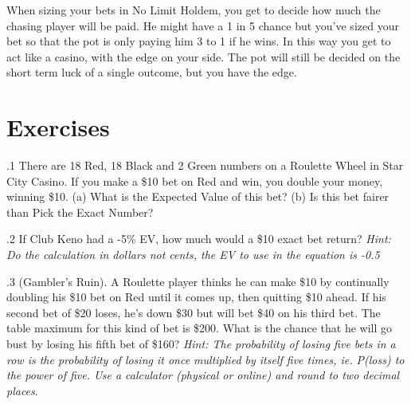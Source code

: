When sizing your bets in No Limit Holdem, you get to decide how much
the chasing player will be paid. He might have a 1 in 5 chance
but you've sized your bet so that the pot is only paying him 3 to 1
if he wins. In this way you get to act like a casino, with the edge
on your side. The pot will still be decided on the short term luck
of a single outcome, but you have the edge.

\section{Exercises}


.1 There are 18 Red, 18 Black and 2 Green numbers on
a Roulette Wheel in Star City Casino. If you make a \$10 bet on Red
and win, you double your money, winning \$10. (a) What is the Expected
Value of this bet? (b) Is this bet fairer than Pick the Exact Number?

.2 If Club Keno had a -5\% EV, how much would a \$10
exact bet return? \textit{Hint: Do the calculation in dollars not
cents, the EV to use in the equation is -0.5}

.3 (Gambler's Ruin). A Roulette player thinks he
can make \$10 by continually doubling his \$10 bet on Red until it
comes up, then quitting \$10 ahead. If his second bet of \$20 loses,
he's down \$30 but will bet \$40 on his third bet. The table maximum
for this kind of bet is \$200. What is the chance that he will go bust
by losing his fifth bet of \$160? \textit{Hint: The probability of
losing five bets in a row is the probability of losing it once
multiplied by itself five times, ie. P(loss) to the power of
five. Use a calculator (physical or online) and round to two
decimal places}.

